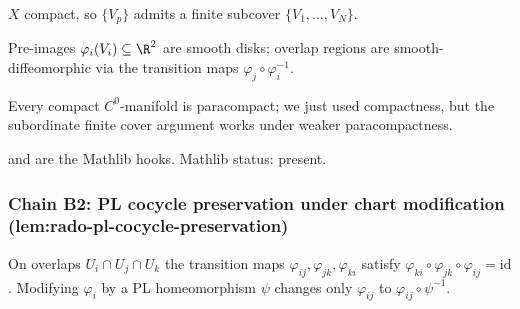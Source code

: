 \begin{lemma}
\label{lem:rfd-r2}
$X$ compact, so $\{V_{p}\}$ admits a finite subcover $\{V_{1}, \ldots, V_{N}\}$.
\leanok\mathlibok
\end{lemma}

\begin{lemma}
\label{lem:rfd-r3}
Pre-images $\varphi_{i}(V_{i}) \subseteq \R^{2}$ are smooth disks; overlap regions are smooth-diffeomorphic via the transition maps $\varphi_{j}\circ\varphi_{i}^{-1}$.
\leanok
\end{lemma}

\begin{lemma}
\label{lem:rfd-r4}
Every compact $C^{0}$-manifold is paracompact; we just used compactness, but the subordinate finite cover argument works under weaker paracompactness.
\leanok\mathlibok
\end{lemma}

\begin{lemma}
\label{lem:rfd-r5}
 and  are the Mathlib hooks.  Mathlib status: present.
\leanok\mathlibok
\end{lemma}

\subsubsection*{Chain B2: PL cocycle preservation under chart modification (lem:rado-pl-cocycle-preservation)}

\begin{lemma}
\label{lem:rpc-r1}
On overlaps $U_{i}\cap U_{j}\cap U_{k}$ the transition maps $\varphi_{ij}, \varphi_{jk}, \varphi_{ki}$ satisfy $\varphi_{ki}\circ\varphi_{jk}\circ\varphi_{ij} = \mathrm{id}$.  Modifying $\varphi_{i}$ by a PL homeomorphism $\psi$ changes only $\varphi_{ij}$ to $\varphi_{ij}\circ\psi^{-1}$.
\leanok
\end{lemma}

